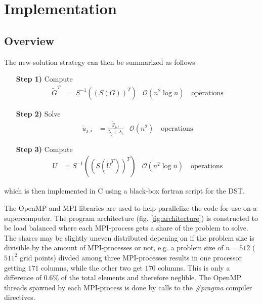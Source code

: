 \documentclass[11pt,a4paper,english]{article}
\numberwithin{figure}{subsection}
\numberwithin{table}{subsection}
\begin{document}
\newpage
\section{Implementation}
\subsection{Overview}
The new solution strategy can then be summarized as follows
\begin{enumerate}
	\item[\textbf{Step 1)}] Compute
		\begin{align*}
		\widetilde{G}^T &=S^{-1}\left(\left(S(G)\right)^T\right)	&\mathcal{O}(n^2\log n) \quad\text{operations}
		\end{align*}
	\item[\textbf{Step 2)}]	Solve 
		\begin{align*}
			\widetilde{u}_{j,i} &= \frac{\widetilde{g}_{j,i}}{\lambda_j + \lambda_i} &\mathcal{O}(n^2) \quad\text{operations}
		\end{align*}
	\item[\textbf{Step 3)}] Compute
		\begin{align*}
			U &= S^{-1}\left((S(\widetilde{U}^T))^T\right)	&\mathcal{O}(n^2\log n) \quad\text{operations}
		\end{align*}
\end{enumerate}
which is then implemented in C using a black-box fortran script for the DST. 

The OpenMP and MPI libraries are used to help parallelize the code for use on a supercomputer. The program architecture (fig. \ref{fig:architecture}) is constructed to be load balanced where each MPI-process gets a share of the problem to solve. The shares may be slightly uneven distributed depening on if the problem size is divisible by the amount of MPI-processes or not, e.g. a problem size of $n=512$ ($511^2$ grid points) divded among three MPI-processes results in one processor getting $171$ columns, while the other two get $170$ columns. This is only a difference of $0.6\%$ of the total elements and therefore neglible. The OpenMP threads spawned by each MPI-process is done by calls to the \textit{\#pragma} compiler directives.
\end{document}
